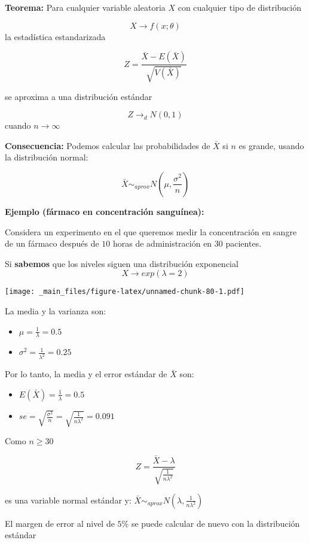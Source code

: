 \documentclass[
]{book}
\providecommand{\tightlist}{%
  \setlength{\itemsep}{0pt}\setlength{\parskip}{0pt}}
\begin{document}
\textbf{Teorema:} Para cualquier variable aleatoria \(X\) con cualquier tipo de distribución

\[X \rightarrow f(x; \theta)\]
la estadística estandarizada

\[Z=\frac{\bar{X}-E(\bar{X})}{\sqrt{V(\bar{X})}}\]

se aproxima a una distribución estándar

\[Z \rightarrow_d N(0,1)\] cuando \(n\rightarrow \infty\)

\textbf{Consecuencia:} Podemos calcular las probabilidades de \(\bar{X}\) si \(n\) es grande, usando la distribución normal:

\[\bar{X} \sim_{aprox} N(\mu, \frac{\sigma^2}{n})\]

\textbf{Ejemplo (fármaco en concentración sanguínea):}

Considera un experimento en el que queremos medir la concentración en sangre de un fármaco después de \(10\) horas de administración en \(30\) pacientes.

Si \textbf{sabemos} que los niveles siguen una distribución exponencial \[X \rightarrow exp(\lambda=2)\]

\texttt{[image: \_main\_files/figure-latex/unnamed-chunk-80-1.pdf]}

La media y la varianza son:

\begin{itemize}
\tightlist
\item
  \(\mu=\frac{1}{\lambda}=0.5\)
\item
  \(\sigma^2=\frac{1}{\lambda^2}=0.25\)
\end{itemize}

Por lo tanto, la media y el error estándar de \(\bar{X}\) son:

\begin{itemize}
\tightlist
\item
  \(E(\bar{X})=\frac{1}{\lambda}=0.5\)
\item
  \(se=\sqrt{\frac{\sigma^2}{n}}=\sqrt{\frac{1}{n\lambda^2}}=0.091\)
\end{itemize}

Como \(n \geq 30\)

\[Z=\frac{\bar{X}-\lambda}{\sqrt{\frac{1}{n\lambda^2}}}\]

es una variable normal estándar y: \(\bar{X} \sim_{aprox} N(\lambda, \frac{1}{n\lambda^2})\)

El margen de error al nivel de \(5\%\) se puede calcular de nuevo con la distribución estándar
\end{document}
